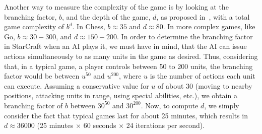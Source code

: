 \documentclass[journal]{IEEEtran}
\begin{document}
Another way  to measure the complexity  of the game is  by looking at
the branching factor, $b$, and the depth of the game, $d$, as proposed in~\cite{Gaby}, with a total game complexity of $b^d$. In Chess, $b \approx 35$ and $d \approx 80$. In more complex games, like Go, $b \approx 30 - 300$, and $d \approx 150 - 200$. In order to determine the branching factor in StarCraft when an AI plays it, we must have in mind, that the AI can issue actions simultaneously to as many units in the game as desired. Thus, considering that, in a typical game, a player controls between 50 to 200 units, the branching factor would be between $u^{50}$ and $u^{200}$, where $u$ is the number of actions each unit can execute. Assuming a conservative value for $u$ of about $30$ (moving to nearby positions, attacking units in range, using special abilities, etc.), we obtain a branching factor of $b$ between  $30^{50}$ and $30^{200}$. Now, to compute $d$, we simply consider the fact that typical games last for about 25 minutes, which results in $d \approx 36000$ (25 minutes $\times$ 60 seconds $\times$ 24 iterations per second).




\end{document}
